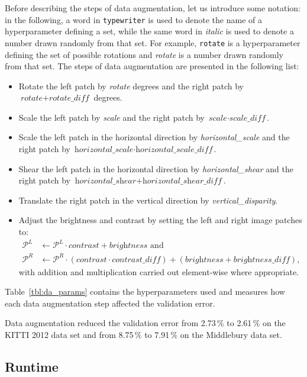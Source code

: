 \documentclass[twoside,11pt]{article}
\begin{document}
Before describing the steps of data augmentation, let us introduce some
notation: in the following, a word in \texttt{typewriter} is used to denote the
name of a hyperparameter defining a set, while the same word in \textit{italic}
is used to denote a number drawn randomly from that set.  For example,
\texttt{rotate} is a hyperparameter defining the set of possible rotations and
\textit{rotate} is a number drawn randomly from that set. 
%
The steps of data augmentation are presented in the following list:
%
\begin{itemize}
\item Rotate the left patch by \textit{rotate} degrees and the right patch by
\(\textit{rotate} + \textit{rotate\_diff}\) degrees.

\item Scale the left patch by \textit{scale} and the right patch by 
\(\textit{scale} \cdot \textit{scale\_diff} \).
\item Scale the left patch in the horizontal direction by \textit{horizontal\_scale} and
the right patch by \(\textit{horizontal\_scale} \cdot \textit{horizontal\_scale\_diff}\).
\item Shear the left patch in the horizontal direction by \textit{horizontal\_shear} and
the right patch by \(\textit{horizontal\_shear} + \textit{horizontal\_shear\_diff}\).
\item Translate the right patch in the vertical direction by \textit{vertical\_disparity}.
\item Adjust the brightness and contrast by setting the left and right image patches to:
\begin{align*}
\mathcal{P}^L &\leftarrow \mathcal{P}^L \cdot \textit{contrast} + \textit{brightness} \text{ and} \\
\mathcal{P}^R &\leftarrow \mathcal{P}^R \cdot (\textit{contrast} \cdot \textit{contrast\_diff}) + 
(\textit{brightness} + \textit{brightness\_diff}),
\end{align*}
with addition and multiplication carried out element-wise where appropriate.

\end{itemize}
Table~\ref{tbl:da_params} contains the hyperparameters used and measures how
each data augmentation step affected the validation error. 

Data augmentation reduced the validation error from 2.73\,\% to 2.61\,\% on the
KITTI 2012 data set and from 8.75\,\% to 7.91\,\% on the Middlebury data set.

\subsection{Runtime}
\end{document}
